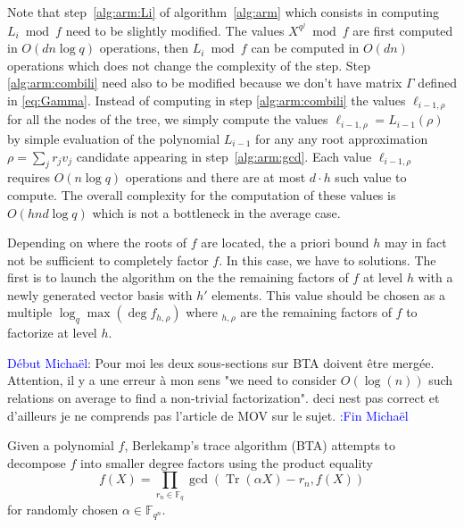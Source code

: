 \documentclass{sig-alternate}
\newcommand{\ff}[1]{\mathbb{F}_{#1}}
\newcommand{\fq}{\ff{q}}
\newcommand{\fqn}{\ff{q^n}}
\newcommand{\dd}{d}
\newcommand{\qq}{q}
\newcommand{\nn}{n}
\DeclareMathOperator{\Tr}{Tr}
\newcommand{\bigO}{O}
\newcounter{algo}
\newcommand{\comd}{\noindent \textcolor{blue}{D\'ebut Micha\"el}:}
\newcommand{\comf}{\noindent \textcolor{blue}{:Fin Micha\"el}}
\begin{document}
Note that step~\ref{alg:arm:Li} of algorithm~\ref{alg:arm} which consists in computing $L_i \bmod f$ need to be slightly modified. The values $X^{q^j}\bmod f$ are first computed in $O(dn\log q)$ operations, then $L_i\bmod f$ can be computed in $O(\dd \nn)$ operations which does not change the complexity of the step. Step \ref{alg:arm:combili} need also to be modified because we don't have matrix $\Gamma$ defined in \eqref{eq:Gamma}. Instead of computing in step \ref{alg:arm:combili}
 the values $\ell_{i-1, \rho}$ for all the nodes of the tree, we simply compute the values $\ell_{i-1, \rho}= L_{i-1}(\rho)$ by simple evaluation of the polynomial $L_{i-1}$ for any any root approximation $\rho=\sum_j r_j v_j$ candidate appearing in step~\ref{alg:arm:gcd}. Each value $\ell_{i-1, \rho}$ requires $\bigO(\nn \log \qq)$ operations and there are at most $d \cdot h$ such value to compute. The overall complexity for the computation of these values is $O(h \nn \dd  \log \qq )$ which is not a bottleneck in the average case. 

Depending on where the roots of $f$ are located, the a priori bound $h$ may in fact not be sufficient to completely factor $f$. In this case, we have to solutions.
The first is to launch the algorithm on the the remaining factors of $f$ at level $h$ with a newly generated vector basis with $h'$ elements. This value should be chosen 
 as a multiple $\log_{\qq} \max(\deg f_{h,\rho})$ where $_{h,\rho}$ are the remaining factors of $f$ to factorize at level $h$.
 

\comd
Pour moi les deux sous-sections sur BTA doivent \^etre merg\'ee. Attention, il y a une erreur \`a mon sens 
"we need to consider $\bigO(\log(n))$ such relations on average to find a non-trivial factorization". deci nest pas correct et d'ailleurs je ne comprends pas l'article de MOV sur le sujet. 
\comf

\medskip

 Given a polynomial $f$, Berlekamp's trace algorithm (BTA) attempts to decompose $f$ into smaller degree factors using the product equality
\begin{equation}\label{BTA_eq1}
f(X)=\prod_{r_n\in\fq}\gcd\left(\Tr(\alpha X)-r_n,f(X)\right)
\end{equation}
for randomly chosen $\alpha\in\fqn$.
\end{document}
